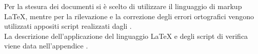 		Per la stesura dei documenti si è scelto di utilizzare il linguaggio di markup \LaTeX{}, mentre per la rilevazione e la correzione degli errori ortografici vengono utilizzati appositi script realizzati dagli . \\
		La descrizione dell'applicazione del linguaggio \LaTeX{} e degli script di verifica viene data nell'appendice .
